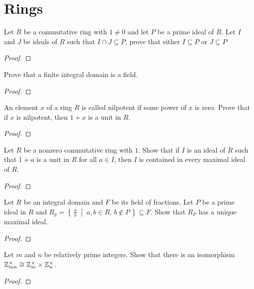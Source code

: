 \section{Rings}
\begin{problem}
  Let $R$ be a commutative ring with $1\neq 0$ and let $P$ be a
  prime ideal of $R$. Let $I$ and $J$ be ideals of $R$ such that
  $I\cap J\subseteq P$, prove that either $I\subseteq P$ or
  $J\subseteq P$
\end{problem}
\begin{proof}
\end{proof}
\begin{problem}
  Prove that a finite integral domain is a field.
\end{problem}
\begin{proof}
\end{proof}

\begin{problem}
  An element $x$ of a ring $R$ is called nilpotent if some power
  of $x$ is zero. Prove that if $x$ is nilpotent, then $1+x$ is a
  unit in $R$.
\end{problem}
\begin{proof}
\end{proof}

\begin{problem}
  Let $R$ be a nonzero commutative ring with $1$. Show that if
  $I$ is an ideal of $R$ such that $1+a$ is a unit in $R$ for all
  $a\in I$, then $I$ is contained in every maximal ideal of $R$.
\end{problem}
\begin{proof}
\end{proof}

\begin{problem}
  Let $R$ be an integral domain and $F$ be its field of
  fractions. Let $P$ be a prime ideal in $R$ and
  $R_p=\left\{\,\tfrac{a}{b}\;\middle|\;a,b\in R,\,b\notin
    P\,\right\}\subseteq F$.
  Show that $R_P$ has a unique maximal ideal.
\end{problem}
\begin{proof}
\end{proof}

\begin{problem}
  Let $m$ and $n$ be relatively prime integers. Show that there
  is an isomorphism
  $\mathbb{Z}_{mn}^\times\cong\mathbb{Z}_m^\times\times\mathbb{Z}_n^\times$.
\end{problem}
\begin{proof}
\end{proof}

